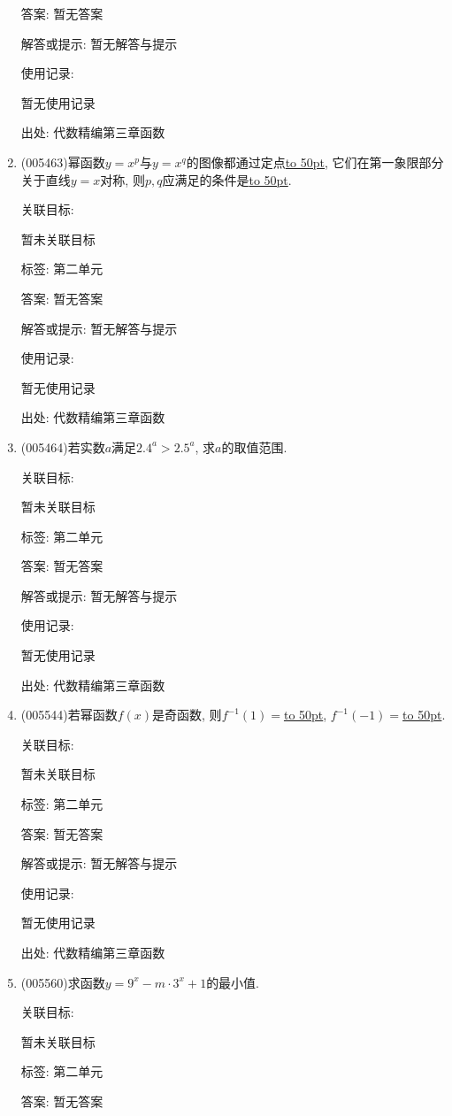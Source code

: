 \documentclass[10pt,a4paper]{article}
\newcommand{\blank}[1]{\underline{\hbox to #1pt{}}}
\begin{document}
\begin{enumerate}[1.]
答案: 暂无答案

解答或提示: 暂无解答与提示

使用记录:

暂无使用记录


出处: 代数精编第三章函数
\item { (005463)}幂函数$y=x^p$与$y=x^q$的图像都通过定点\blank{50}, 它们在第一象限部分关于直线$y=x$对称, 则$p,q$应满足的条件是\blank{50}.


关联目标:

暂未关联目标



标签: 第二单元

答案: 暂无答案

解答或提示: 暂无解答与提示

使用记录:

暂无使用记录


出处: 代数精编第三章函数
\item { (005464)}若实数$a$满足$2.4^a>2.5^a$, 求$a$的取值范围.


关联目标:

暂未关联目标



标签: 第二单元

答案: 暂无答案

解答或提示: 暂无解答与提示

使用记录:

暂无使用记录


出处: 代数精编第三章函数
\item { (005544)}若幂函数$f(x)$是奇函数, 则$f^{-1}(1)=$\blank{50}, $f^{-1}(-1)=$\blank{50}.


关联目标:

暂未关联目标



标签: 第二单元

答案: 暂无答案

解答或提示: 暂无解答与提示

使用记录:

暂无使用记录


出处: 代数精编第三章函数
\item { (005560)}求函数$y=9^x-m\cdot 3^x+1$的最小值.


关联目标:

暂未关联目标



标签: 第二单元

答案: 暂无答案


\end{enumerate}
\end{document}
